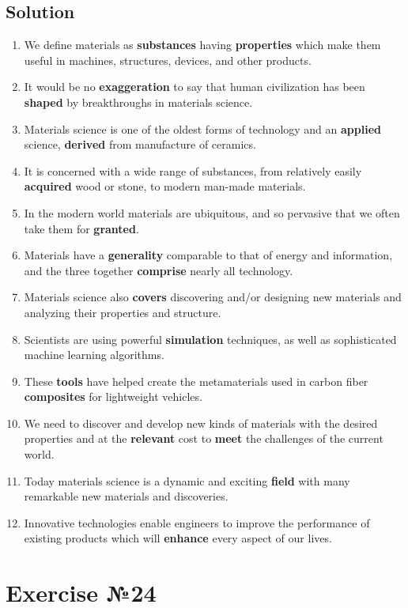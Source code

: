 \subsection*{Solution}
\begin{enumerate}
      \item We define materials as \textbf{substances} having \textbf{properties} which make them useful in machines, structures, devices, and other products.
      \item It would be no \textbf{exaggeration} to say that human civilization has been \textbf{shaped} by breakthroughs in materials science.
      \item Materials science is one of the oldest forms of technology and an \textbf{applied} science, \textbf{derived} from manufacture of ceramics.
      \item It is concerned with a wide range of substances, from relatively easily \textbf{acquired} wood or stone, to modern man-made materials.
      \item In the modern world materials are ubiquitous, and so pervasive that we often take them for \textbf{granted}.
      \item Materials have a \textbf{generality} comparable to that of energy and information, and the three together \textbf{comprise} nearly all technology.
      \item Materials science also \textbf{covers} discovering and/or designing new materials and analyzing their properties and structure.
      \item Scientists are using powerful \textbf{simulation} techniques, as well as sophisticated machine learning algorithms.
      \item These \textbf{tools} have helped create the metamaterials used in carbon fiber \textbf{composites} for lightweight vehicles.
      \item We need to discover and develop new kinds of materials with the desired properties and at the \textbf{relevant} cost to \textbf{meet} the challenges of the current world.
      \item Today materials science is a dynamic and exciting \textbf{field} with many remarkable new materials and discoveries.
      \item Innovative technologies enable engineers to improve the performance of existing products which will \textbf{enhance} every aspect of our lives.
\end{enumerate}

\section{Exercise №24}

